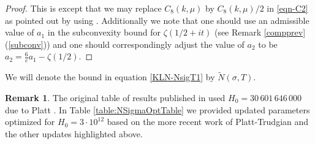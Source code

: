 \documentclass[10pt]{amsart}
\theoremstyle{definition}
\newtheorem{Rem}[prop]{Remark}
\numberwithin{equation}{section}
\begin{document}
\begin{proof}
This is \cite[Theorem 1.1]{KLN18}  except that we may replace $C_8(k,\mu)$ by $C_8(k,\mu)/2$ in \eqref{eqn-C2} as pointed out by \cite[Section 6]{CulJoh21} using \cite[Theorem 2]{CT21}.
Additionally we note that one should use an admissible value of $a_1$ in the subconvexity bound for $\zeta(1/2+it)$ (see Remark \ref{compprev}(\ref{subconv})) and one should correspondingly adjust the value of $a_2$ to be $a_2 = \tfrac{6}{e}a_1-\zeta(1/2)$. 
\end{proof}

We will denote the bound in equation \eqref{KLN-NsigT1} by $\tilde{N}(\sigma, T)$. 

\begin{Rem}
The original table of results published in \cite{KLN18} used $H_0 = 30\,601\,646\,000$ due to Platt \cite{Pla17}. In Table \ref{table:NSigmaOptTable}
we provided updated parameters optimized for $H_0 = 3\cdot 10^{12}$ based on the more recent work of Platt-Trudgian \cite{PlaTru21RH} and the other updates highlighted above.
\end{Rem}
\end{document}
